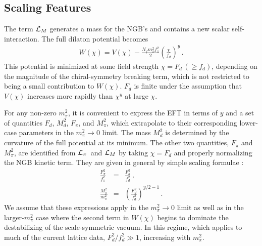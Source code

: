 \documentclass[a4paper,11pt]{article}
\newcommand{\beqs}{\begin{eqnarray}}
\newcommand{\eeqs}{\end{eqnarray}}
\begin{document}
\subsection{Scaling Features}

The term ${\cal L}_M$ generates a mass for the NGB's and contains a new scalar self-interaction. The full dilaton potential becomes 
\beqs
W(\chi) = V(\chi) - \frac{N_f m_{\pi}^2 f_{\pi}^2}{ 2} \left(\frac{\chi }{f_d}\right)^{y}\,.
\label{Eq:W}
\eeqs
This potential is minimized at some field strength $\chi = F_d\, (\geq f_d) $, depending on the magnitude of the chiral-symmetry breaking term, which is not restricted to being a small contribution to $W(\chi)$. 
$F_d$ is finite under the assumption that $V(\chi)$ increases more rapidly than $\chi^y$ at large $\chi$. 


For any non-zero $m_{\pi}^2$, it is convenient to express the EFT in terms of $y$ and a set of quantities $F_d$, $M_d^2$, $F_{\pi}$, and $M_{\pi}^2$, which extrapolate to their corresponding lower-case parameters in the $m^2_\pi\rightarrow0$ limit. The mass $M_d^2$ is determined by the curvature of the full potential at its minimum.  The other two quantities, $F_{\pi}$ and $M_{\pi}^2$, are identified from ${\cal L}_{\pi}$\ and ${\cal L}_M$ by taking $\chi = F_d$ and properly normalizing the NGB kinetic term.
They are given in general by simple scaling formulae \cite{EFTDilaton1,AIP}:
\beqs
\label{Eq:scaling1}
\frac{F_{\pi}^2}{f_{\pi}^2}&=&\frac{F_{d}^2}{f_{d}^2}\,,\\ 
\frac{M_{\pi}^2}{{m}_{\pi}^2}&=&\left(\frac{F_{d}^2}{f_{d}^2}\right)^{y/2-1}\,.
\label{Eq:scaling2}
\eeqs
We assume that these expressions apply in the $m^2_\pi\rightarrow0$ limit as well as in the larger-$m_{\pi}^2$ case where the second term in $W(\chi)$ begins to dominate the destabilizing of the scale-symmetric vacuum. In this regime, which applies to much of the current lattice data, $F_{d}^2/f_{d}^2 \gg 1$, increasing with $m_{\pi}^2$.
\end{document}

